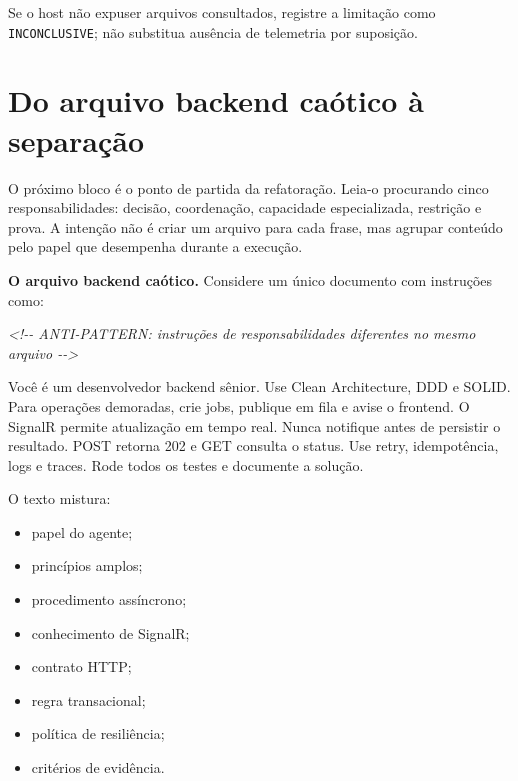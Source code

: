 \documentclass[
  10pt,
  a4paper,
  oneside]{book}
\newenvironment{Shaded}{}{}
\newcommand{\CommentTok}[1]{\textcolor[rgb]{0.38,0.63,0.69}{\textit{#1}}}
\newcommand{\NormalTok}[1]{#1}
\providecommand{\tightlist}{%
  \setlength{\itemsep}{0pt}\setlength{\parskip}{0pt}}
\begin{document}
Se o host não expuser arquivos consultados, registre a limitação como
\texttt{INCONCLUSIVE}; não substitua ausência de telemetria por
suposição.

\hypertarget{do-arquivo-backend-cauxf3tico-uxe0-separauxe7uxe3o}{%
\section{Do arquivo backend caótico à
separação}\label{do-arquivo-backend-cauxf3tico-uxe0-separauxe7uxe3o}}

O próximo bloco é o ponto de partida da refatoração. Leia-o procurando
cinco responsabilidades: decisão, coordenação, capacidade especializada,
restrição e prova. A intenção não é criar um arquivo para cada frase,
mas agrupar conteúdo pelo papel que desempenha durante a execução.

\textbf{O arquivo backend caótico.} Considere um único documento com
instruções como:

\begin{Shaded}
\begin{Highlighting}[]
\CommentTok{\textless{}!{-}{-} ANTI{-}PATTERN: instruções de responsabilidades diferentes no mesmo arquivo {-}{-}\textgreater{}}

\NormalTok{Você é um desenvolvedor backend sênior.}
\NormalTok{Use Clean Architecture, DDD e SOLID.}
\NormalTok{Para operações demoradas, crie jobs, publique em fila e avise o frontend.}
\NormalTok{O SignalR permite atualização em tempo real.}
\NormalTok{Nunca notifique antes de persistir o resultado.}
\NormalTok{POST retorna 202 e GET consulta o status.}
\NormalTok{Use retry, idempotência, logs e traces.}
\NormalTok{Rode todos os testes e documente a solução.}
\end{Highlighting}
\end{Shaded}

O texto mistura:

\begin{itemize}
\tightlist
\item
  papel do agente;
\item
  princípios amplos;
\item
  procedimento assíncrono;
\item
  conhecimento de SignalR;
\item
  contrato HTTP;
\item
  regra transacional;
\item
  política de resiliência;
\item
  critérios de evidência.
\end{itemize}
\end{document}
